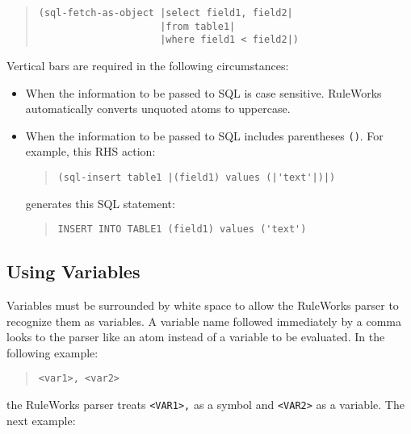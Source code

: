 \begin{quote}
\begin{verbatim}
(sql-fetch-as-object |select field1, field2|
                     |from table1|
                     |where field1 < field2|)
\end{verbatim}
\end{quote}

Vertical bars are required in the following circumstances:

\begin{itemize}
\item When the information to be passed to SQL is case
  sensitive. RuleWorks automatically converts unquoted atoms to
  uppercase.
\item When the information to be passed to SQL includes parentheses
  \verb|()|. For example, this RHS action:

\begin{quote}
\begin{verbatim}
(sql-insert table1 |(field1) values (|'text'|)|)
\end{verbatim}
\end{quote}

generates this SQL statement:

\begin{quote}
\begin{verbatim}
INSERT INTO TABLE1 (field1) values ('text')
\end{verbatim}
\end{quote}

\end{itemize}
      
\subsection{Using Variables}

Variables must be surrounded by white space to allow the RuleWorks
parser to recognize them as variables. A variable name followed
immediately by a comma looks to the parser like an atom instead of a
variable to be evaluated. In the following example:

\begin{quote}
\begin{verbatim}
<var1>, <var2>
\end{verbatim}
\end{quote}

the RuleWorks parser treats \verb|<VAR1>,| as a symbol and
\verb|<VAR2>| as a variable. The next example:

